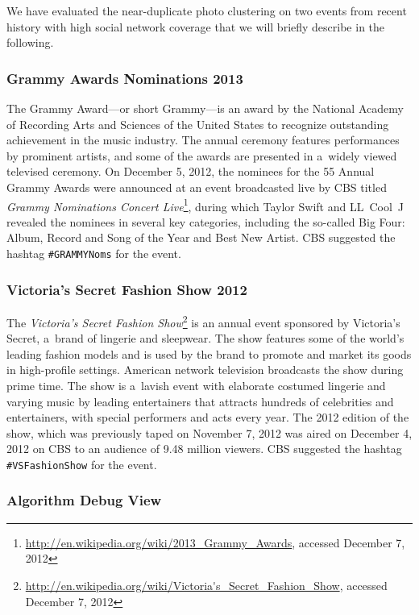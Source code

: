 We have evaluated the near-duplicate photo clustering
on two events from recent history with high social network coverage
that we will briefly describe in the following.

\subsubsection{Grammy Awards Nominations 2013}

The Grammy Award---or short Grammy---is an award by
the National Academy of Recording Arts and Sciences of the United States
to recognize outstanding achievement in the music industry.
The annual ceremony features performances by prominent artists,
and some of the awards are presented in a~widely viewed televised ceremony.
On December 5, 2012, the nominees for the 55 Annual Grammy Awards
were announced at an event broadcasted live by CBS
titled \emph{Grammy Nominations Concert
Live}\footnote{\url{http://en.wikipedia.org/wiki/2013_Grammy_Awards},
accessed December 7, 2012},
during which Taylor Swift and LL~Cool~J revealed the nominees in several key categories, including the so-called Big Four: Album, Record and Song of the Year and Best New Artist.
CBS suggested the hashtag \texttt{\#GRAMMYNoms} for the event.

\subsubsection{Victoria's Secret Fashion Show 2012}

The \emph{Victoria's Secret Fashion
Show}\footnote{\url{http://en.wikipedia.org/wiki/Victoria's_Secret_Fashion_Show},
accessed December 7, 2012} is an annual event
sponsored by Victoria's Secret, a~brand of lingerie and sleepwear.
The show features some of the world's leading fashion models
and is used by the brand to promote and market its goods in high-profile settings.
American network television broadcasts the show during prime time.
The show is a~lavish event with elaborate costumed lingerie and
varying music by leading entertainers
that attracts hundreds of celebrities and entertainers,
with special performers and acts every year.
The 2012 edition of the show,
which was previously taped on November 7, 2012
was aired on December 4, 2012 on CBS
to an audience of 9.48 million viewers.
CBS suggested the hashtag \texttt{\#VSFashionShow} for the event.

\subsubsection{Algorithm Debug View}

